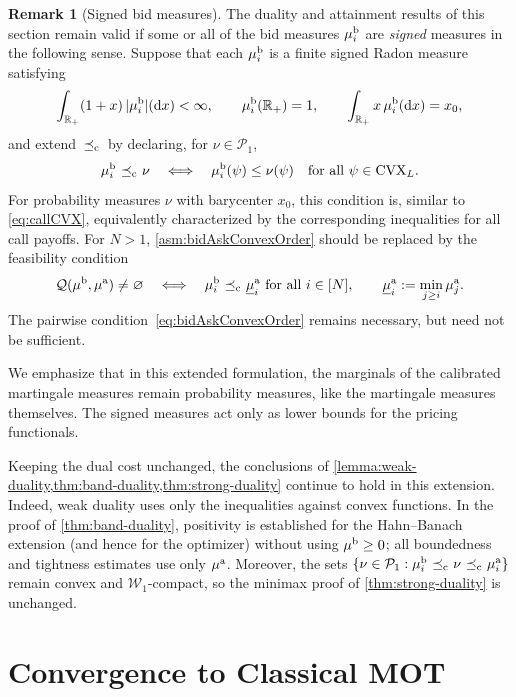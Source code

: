 \documentclass[11pt]{article}
\newcommand{\cP}{\mathcal{P}}
\newcommand{\cQ}{\mathcal{Q}}
\newcommand{\cW}{\mathcal{W}}
\newcommand{\R}{\mathbb{R}} %
\theoremstyle{plain}
\theoremstyle{definition}
\newtheorem{remark}[theorem]{Remark}
\theoremstyle{remark}
\newcommand*{\rd}{\mathrm{d}}
\DeclareMathOperator{\cleq}{\,\preceq_{\rm c}\,}
\theoremstyle{plain}
\begin{document}
\begin{remark}[Signed bid measures]\label{rem:signed-bid-measures}
The duality and attainment results of this section remain valid if some or
all of the bid measures $\mu_i^{\rm b}$ are \emph{signed} measures in the following sense. Suppose
that each $\mu_i^{\rm b}$ is a finite signed Radon measure satisfying
\[
    \int_{\R_+}(1+x)\,\lvert\mu_i^{\rm b}\rvert(\rd x)<\infty,
    \qquad
    \mu_i^{\rm b}(\R_+)=1,
    \qquad
    \int_{\R_+}x\,\mu_i^{\rm b}(\rd x)=x_0,
\]
and extend $\cleq$ by declaring, for $\nu\in\cP_1$,
\[
    \mu_i^{\rm b}\cleq\nu
    \quad\Longleftrightarrow\quad
    \mu_i^{\rm b}(\psi)\leq\nu(\psi)
    \quad\text{for all }\psi\in\textnormal{CVX}_L.
\]
For probability measures $\nu$ with barycenter $x_0$, this condition is,  similar to \eqref{eq:callCVX}, 
equivalently characterized by the corresponding inequalities for all call
payoffs. For $N>1$, \cref{asm:bidAskConvexOrder} should be replaced by the feasibility condition
\[
    \cQ(\mu^{\rm b},\mu^{\rm a})\neq\varnothing
    \quad\Longleftrightarrow\quad
    \mu_i^{\rm b}\cleq\underline{\mu}_i^{\rm a}
    \ \text{for all }i\in[N],
    \qquad
    \underline{\mu}_i^{\rm a}:=\min_{j\geq i}\mu_j^{\rm a}.
\]
The pairwise condition~\eqref{eq:bidAskConvexOrder} remains necessary, but
need not be sufficient.

We emphasize that in this extended formulation, the marginals of the calibrated martingale measures remain probability measures, like the martingale measures themselves. The signed measures act only as lower bounds for the pricing functionals.


Keeping the dual cost unchanged, the conclusions of
\cref{lemma:weak-duality,thm:band-duality,thm:strong-duality} continue to
hold in this extension. Indeed, weak duality uses only the inequalities against convex
functions. In the proof of \cref{thm:band-duality}, positivity is established
for the Hahn--Banach extension (and hence for the optimizer) without using
$\mu^{\rm b}\geq0$; all boundedness and tightness estimates use only
$\mu^{\rm a}$. Moreover, the sets
\(
    \{\nu\in\cP_1:
        \mu_i^{\rm b}\cleq\nu\cleq\mu_i^{\rm a}\}
\)
remain convex and $\cW_1$-compact, so the minimax proof of
\cref{thm:strong-duality} is unchanged.
\end{remark}


%
%
%

\section{Convergence to Classical MOT}\label{sec:convergence}
\end{document}
